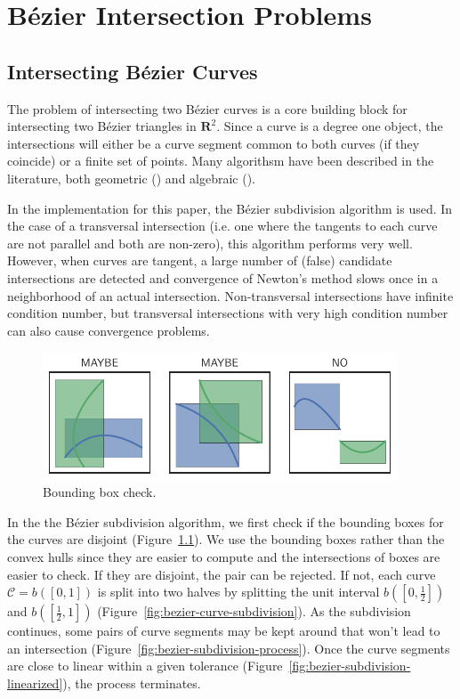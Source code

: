 \chapter{B\'{e}zier Intersection Problems}

\section{Intersecting B\'{e}zier Curves}

The problem of intersecting two B\'{e}zier curves is a core building
block for intersecting two B\'{e}zier triangles in \(\mathbf{R}^2\).
Since a curve is a degree one object, the intersections will either
be a curve segment common to both curves (if they coincide) or a finite
set of points.
Many algorithsm have been described in the literature, both
geometric (\cite{Sederberg1986, Sederberg1990, Kim1998}) and
algebraic (\cite{Manocha:CSD-92-698}).

In the implementation for this paper, the B\'{e}zier subdivision
algorithm is used.
In the case of a transversal intersection (i.e. one where the
tangents to each curve are not parallel and both are non-zero),
this algorithm performs very well. However, when curves are tangent,
a large number of (false) candidate intersections are detected and
convergence of Newton's method slows once in a neighborhood of an
actual intersection. Non-transversal intersections
have infinite condition number, but transversal intersections with
very high condition number can also cause convergence problems.

\begin{figure}
  \includegraphics[width=0.9375\textwidth]{../images/curved-mesh/bbox_check.pdf}
  \centering
  \caption{Bounding box check.}
  \label{fig:bounding-box-check}
\end{figure}

In the the B\'{e}zier subdivision algorithm, we first check if the
bounding boxes for the curves are disjoint
(Figure~\ref{fig:bounding-box-check}). We use the bounding boxes
rather than the convex hulls since they are easier to compute and
the intersections of boxes are easier to check.
If they are disjoint, the pair can be rejected. If not, each curve
\(\mathcal{C} = b\left(\left[0, 1\right]\right)\) is split into two halves
by splitting the unit interval \(b\left(\left[0, \frac{1}{2}\right]\right)\)
and \(b\left(\left[\frac{1}{2}, 1\right]\right)\)
(Figure~\ref{fig:bezier-curve-subdivision}). As the subdivision continues,
some pairs of curve segments may be kept around that won't lead to an
intersection (Figure~\ref{fig:bezier-subdivision-process}).
Once the curve segments are close to linear within a given tolerance
(Figure~\ref{fig:bezier-subdivision-linearized}), the process
terminates.


